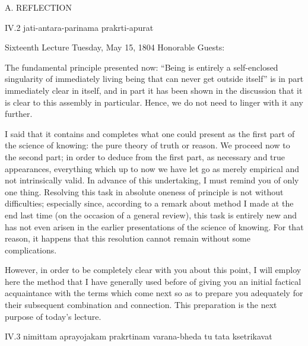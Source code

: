 A. REFLECTION

IV.2
jati-antara-parinama prakrti-apurat

Sixteenth Lecture
Tuesday, May 15, 1804
Honorable Guests:

The fundamental principle presented now:
“Being is entirely a self-enclosed singularity
of immediately living being
that can never get outside itself”
is in part immediately clear in itself,
and in part it has been shown in the discussion
that it is clear to this assembly in particular.
Hence, we do not need to linger with it any further.

I said that it contains and completes
what one could present as the first part
of the science of knowing:
the pure theory of truth or reason.
We proceed now to the second part;
in order to deduce from the first part,
as necessary and true appearances,
everything which up to now we have
let go as merely empirical
and not intrinsically valid.
In advance of this undertaking,
I must remind you of only one thing.
Resolving this task in absolute oneness
of principle is not without difficulties;
especially since, according to a remark about method
I made at the end last time
(on the occasion of a general review),
this task is entirely new
and has not even arisen in the earlier
presentations of the science of knowing.
For that reason, it happens that this resolution
cannot remain without some complications.

However, in order to be completely clear with you about this point,
I will employ here the method that I have generally used before
of giving you an initial factical acquaintance with the terms
which come next so as to prepare you adequately
for their subsequent combination and connection.
This preparation is the next purpose of today's lecture.

IV.3
nimittam aprayojakam prakrtinam varana-bheda tu tata ksetrikavat

